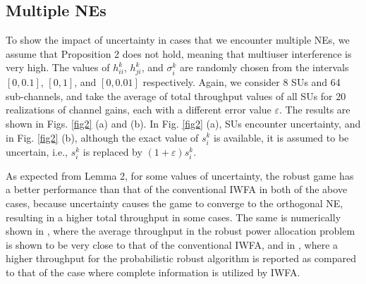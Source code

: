 \documentclass[peerreview,onecolumn,11pt,draftclsnofoot]{IEEEtran}\usepackage{amsmath}\usepackage{amsfonts}\usepackage{epsfig}\usepackage{amssymb}\usepackage{graphicx}\usepackage{amssymb,amsmath}\usepackage{cite}\usepackage{color,soul}\newcommand\T{\rule{0pt}{3.1ex}}
\begin{document}
\subsection{Multiple NEs}
To show the impact of uncertainty in cases that we encounter
multiple NEs, we assume that Proposition 2 does not hold, meaning that multiuser interference is very high. The values of $h^{k}_{ii}$, $h^{k}_{ji}$, and $\sigma^{k}_i$ are randomly chosen from the intervals $[0, 0.1]$, $[0, 1]$, and $[0,0.01]$ respectively. Again, we consider 8 SUs and 64 sub-channels, and take the average of total throughput values of all SUs for 20 realizations of channel gains, each with a different error value $\varepsilon$. The results are shown in Figs. \ref{fig2} (a) and (b). In Fig. \ref{fig2} (a), SUs encounter  uncertainty, and in Fig. \ref{fig2} (b), although the exact value of $s_{i}^{k}$ is available, it is assumed to be uncertain, i.e., $s_{i}^{k}$ is replaced by $(1+\varepsilon)s_{i}^{k}$.

As expected from Lemma 2, for some values of uncertainty, the robust game has a better performance than that of the conventional IWFA in both of the above cases, because uncertainty causes the game to converge to the orthogonal NE, resulting in a higher total throughput in some cases. The same is numerically shown in \cite{Robusthaykin}, where the
average throughput in the robust power allocation problem is shown to be very close to that of the conventional IWFA, and in
\cite{ProbabilisticIWFA}, where a higher throughput for the
probabilistic robust algorithm is reported as compared to that of the case where complete information is utilized by IWFA.
\end{document}

